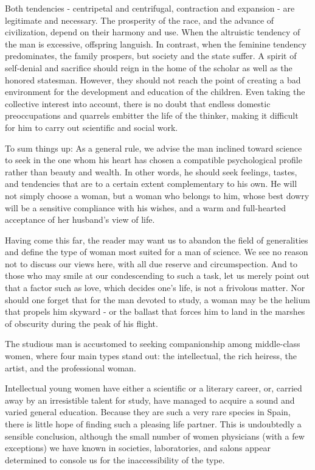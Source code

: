 \documentclass{article}
\begin{document}
Both tendencies - centripetal and centrifugal, contraction and expansion - are legitimate and necessary. The prosperity of the race, and the advance of civilization, depend on their harmony and use. When the altruistic tendency of the man is excessive, offspring languish. In contrast, when the feminine tendency predominates, the family prospers, but society and the state suffer. A spirit of self-denial and sacrifice should reign in the home of the scholar as well as the honored statesman. However, they should not reach the point of creating a bad environment for the development and education of the children. Even taking the collective interest into account, there is no doubt that endless domestic preoccupations and quarrels embitter the life of the thinker, making it difficult for him to carry out scientific and social work.

To sum things up: As a general rule, we advise the man inclined toward science to seek in the one whom his heart has chosen a compatible psychological profile rather than beauty and wealth. In other words, he should seek feelings, tastes, and tendencies that are to a certain extent complementary to his own. He will not simply choose a woman, but a woman who belongs to him, whose best dowry will be a sensitive compliance with his wishes, and a warm and full-hearted acceptance of her husband’s view of life.

Having come this far, the reader may want us to abandon the field of generalities and define the type of woman most suited for a man of science. We see no reason not to discuss our views here, with all due reserve and circumspection. And to those who may smile at our condescending to such a task, let us merely point out that a factor such as love, which decides one’s life, is not a frivolous matter. Nor should one forget that for the man devoted to study, a woman may be the helium that propels him skyward - or the ballast that forces him to land in the marshes of obscurity during the peak of his flight.

The studious man is accustomed to seeking companionship among middle-class women, where four main types stand out: the intellectual, the rich heiress, the artist, and the professional woman.

Intellectual young women have either a scientific or a literary career, or, carried away by an irresistible talent for study, have managed to acquire a sound and varied general education. Because they are such a very rare species in Spain, there is little hope of finding such a pleasing life partner. This is undoubtedly a sensible conclusion, although the small number of women physicians (with a few exceptions) we have known in societies, laboratories, and salons appear determined to console us for the inaccessibility of the type.
\end{document}
